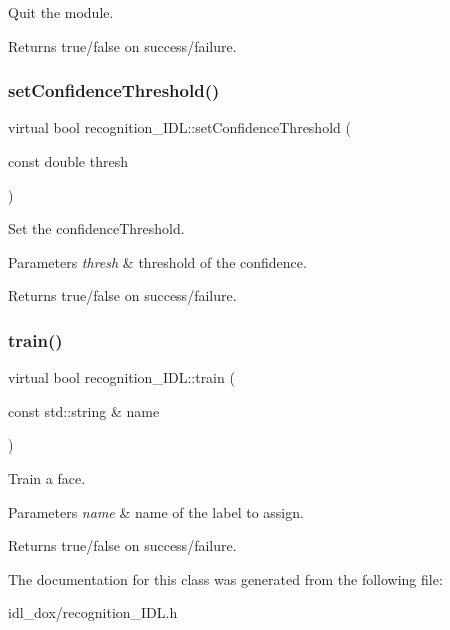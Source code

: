 Quit the module. 

\begin{DoxyReturn}{Returns}
true/false on success/failure. 
\end{DoxyReturn}
\mbox{\label{classrecognition__IDL_ab4ab3c0a86b630b85e411ff39720fc3d}} 
\subsubsection{\texorpdfstring{setConfidenceThreshold()}{setConfidenceThreshold()}}
{\footnotesize\ttfamily virtual bool recognition\+\_\+\+I\+D\+L\+::set\+Confidence\+Threshold (\begin{DoxyParamCaption}\item[{const double}]{thresh }\end{DoxyParamCaption})\hspace{0.3cm}{\ttfamily [virtual]}}



Set the confidence\+Threshold. 


\begin{DoxyParams}{Parameters}
{\em thresh} & threshold of the confidence. \\
\hline
\end{DoxyParams}
\begin{DoxyReturn}{Returns}
true/false on success/failure. 
\end{DoxyReturn}
\mbox{\label{classrecognition__IDL_acf63e73eba86bdffa4620aa4240ed17f}} 
\subsubsection{\texorpdfstring{train()}{train()}}
{\footnotesize\ttfamily virtual bool recognition\+\_\+\+I\+D\+L\+::train (\begin{DoxyParamCaption}\item[{const std\+::string \&}]{name }\end{DoxyParamCaption})\hspace{0.3cm}{\ttfamily [virtual]}}



Train a face. 


\begin{DoxyParams}{Parameters}
{\em name} & name of the label to assign. \\
\hline
\end{DoxyParams}
\begin{DoxyReturn}{Returns}
true/false on success/failure. 
\end{DoxyReturn}


The documentation for this class was generated from the following file\+:\begin{DoxyCompactItemize}
\item 
idl\+\_\+dox/recognition\+\_\+\+I\+D\+L.\+h\end{DoxyCompactItemize}
